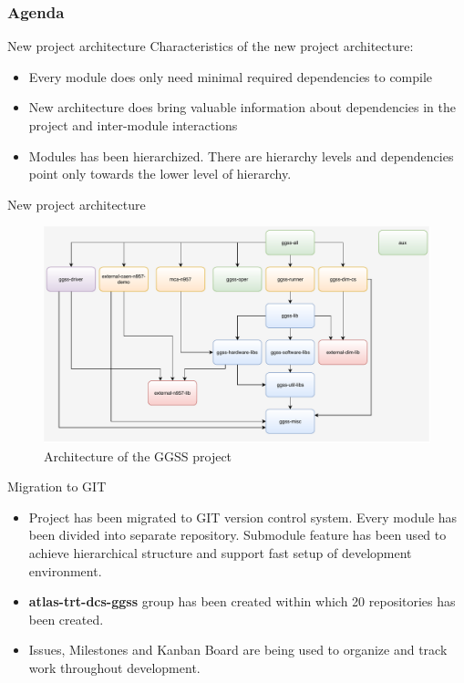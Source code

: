 \documentclass[10pt]{beamer}
\title{}
\subtitle{\normalsize{Tasks undertaken as part of the engineering thesis}}
\date{17\textsuperscript{th} February 2020}
\author{\normalsize{Arkadiusz Kasprzak \newline \and Jarosław Cierpich \newline \and Grzegorz Podsiadło \newline \newline \and Supervisor: Bartosz Mindur}}
\begin{document}
\maketitle

\begin{frame}
\frametitle{Agenda}
\tableofcontents
\end{frame}

\begin{frame}{New project architecture}
Characteristics of the new project architecture:
\begin{itemize}
	\item Every module does only need minimal required dependencies to compile
	\item New architecture does bring valuable information about dependencies in the project and inter-module interactions
	\item Modules has been hierarchized. There are hierarchy levels and dependencies point only towards the lower level of hierarchy.
\end{itemize}
\end{frame}

\begin{frame}{New project architecture}
\begin{figure}
\centering
\includegraphics[width=\linewidth]{resources/topLevelArchitecture}
\caption{Architecture of the GGSS project}
\end{figure}
\end{frame}

\begin{frame}{Migration to GIT}
\begin{itemize}
	\item Project has been migrated to GIT version control system. Every module has been divided into separate repository. Submodule feature has been used to achieve hierarchical structure and support fast setup of development environment.
	\item \textbf{atlas-trt-dcs-ggss} group has been created within which 20 repositories has been created.
	\item Issues, Milestones and Kanban Board are being used to organize and track work throughout development.
\end{itemize}
\end{frame}
\end{document}

